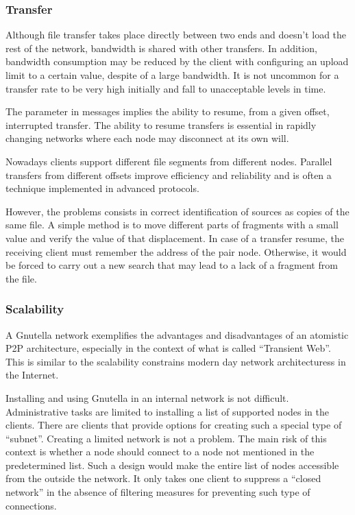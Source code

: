 \subsubsection{Transfer}

Although file transfer takes place directly between two ends and doesn't
load the rest of the network, bandwidth is shared with other transfers. In
addition, bandwidth consumption may be reduced by the client with configuring
an upload limit to a certain value, despite of a large bandwidth. It is not
uncommon for a transfer rate to be very high initially and fall to
unacceptable levels in time.

The parameter in messages implies the ability to resume, from a given offset,
interrupted transfer. The ability to resume transfers is essential in rapidly
changing networks where each node may disconnect at its own will.

Nowadays clients support different file segments from different nodes.
Parallel transfers from different offsets improve efficiency and reliability
and is often a technique implemented in advanced protocols.

However, the problems consists in correct identification of sources as copies
of the same file. A simple method is to move different parts of fragments with
a small value and verify the value of that displacement. In case of a transfer
resume, the receiving client must remember the address of the pair node.
Otherwise, it would be forced to carry out a new search that may lead to
a lack of a fragment from the file.

\subsubsection{Scalability}

A Gnutella network exemplifies the advantages and disadvantages of an atomistic
P2P architecture, especially in the context of what is called ``Transient Web''.
This is similar to the scalability constrains modern day network
architecturess in the Internet.

Installing and using Gnutella in an internal network is not difficult.
Administrative tasks are limited to installing a list of supported nodes in
the clients. There are clients that provide options for creating such a
special type of ``subnet''. Creating a limited network is not a problem. The
main risk of this context is whether a node should connect to a node not
mentioned in the predetermined list. Such a design would make the entire list
of nodes accessible from the outside the network. It only takes one client to
suppress a ``closed network'' in the absence of filtering measures for
preventing such type of connections.

